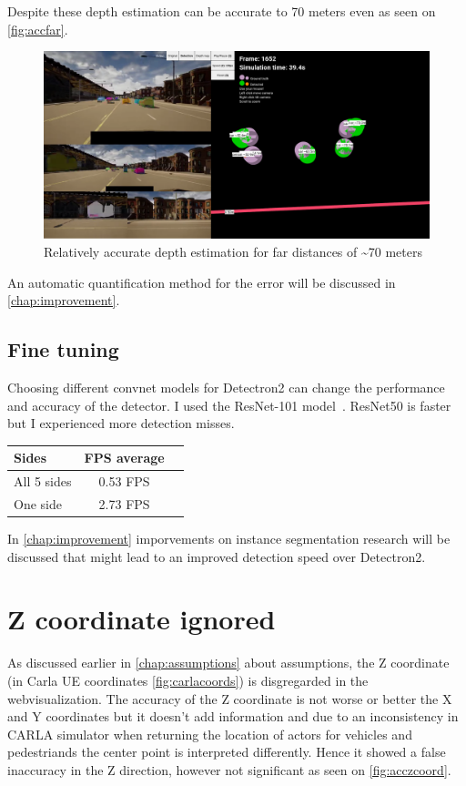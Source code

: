 Despite these depth estimation can be accurate to 70 meters even as seen on \autoref{fig:accfar}.
\begin{figure}[!ht]
	\centering
	\includegraphics[width=150mm, keepaspectratio]{figures/accfar.png}
	\caption{Relatively accurate depth estimation for far distances of \textasciitilde70 meters}
	\label{fig:accfar}
\end{figure}

An automatic quantification method for the error will be discussed in \autoref{chap:improvement}.

\subsection{Fine tuning}
Choosing different convnet models for Detectron2 can change the performance and
accuracy of the detector. I used the ResNet-101
model~\cite{DBLP:journals/corr/HeZRS15}. ResNet50 is faster but I experienced
more detection misses.

\begin{table}[ht]
	\footnotesize
	\centering
	\begin{tabular}{ l c c }
		\toprule
		Sides       & FPS average \\
		\midrule
		All 5 sides & 0.53 FPS    \\
		One side    & 2.73 FPS    \\
		\bottomrule
	\end{tabular}
	\label{tab:TabularExample}
\end{table}

In \autoref{chap:improvement} imporvements on instance segmentation research
will be discussed that might lead to an improved detection speed over
Detectron2.

\section{Z coordinate ignored}
As discussed earlier in \autoref{chap:assumptions} about assumptions, the Z
coordinate (in Carla UE coordinates \autoref{fig:carlacoords}) is disgregarded
in the webvisualization. The accuracy of the Z coordinate is not worse or better
the X and Y coordinates but it doesn't add information and due to an
inconsistency in CARLA simulator when returning the location of actors for
vehicles and pedestriands the center point is interpreted differently. Hence it
showed a false inaccuracy in the Z direction, however not significant as seen on \autoref{fig:acczcoord}.

